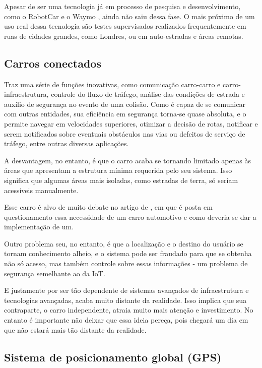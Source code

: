 \documentclass[12pt]{article}
\begin{document}
		Apesar de ser uma tecnologia já em processo de pesquisa e desenvolvimento, como o RobotCar \citep{oxford_robotics_institute_robotcar_nodate} e o Waymo \citep{google_-_alphabet_inc._waymo_2009}, ainda não saiu dessa fase. O mais próximo de um uso real dessa tecnologia são testes supervisados realizados frequentemente em ruas de cidades grandes, como Londres, ou em auto-estradas e áreas remotas.
		
		\subsection{Carros conectados}
		
		Traz uma série de funções inovativas, como comunicação carro-carro e carro-infraestrutura, controle do fluxo de tráfego, análise das condições de estrada e auxílio de segurança no evento de uma colisão. Como é capaz de se comunicar com outras entidades, sua eficiência em segurança torna-se quase absoluta, e o permite navegar em velocidades superiores, otimizar a decisão de rotas, notificar e serem notificados sobre eventuais obstáculos nas vias ou defeitos de serviço de tráfego, entre outras diversas aplicações.
		
		A desvantagem, no entanto, é que o carro acaba se tornando limitado apenas às áreas que apresentam a estrutura mínima requerida pelo seu sistema. Isso significa que algumas áreas mais isoladas, como estradas de terra, só seriam acessíveis manualmente.
		
		Esse carro é alvo de muito debate no artigo de \citet{mcbride_ethics_2016}, em que é posta em questionamento essa necessidade de um carro automotivo e como deveria se dar a implementação de um. 
		
		Outro problema seu, no entanto, é que a localização e o destino do usuário se tornam conhecimento alheio, e o sistema pode ser fraudado para que se obtenha não só acesso, mas também controle sobre essas informações - um problema de segurança semelhante ao da IoT.
		
		E justamente por ser tão dependente de sistemas avançados de infraestrutura e tecnologias avançadas, acaba muito distante da realidade. Isso implica que sua contraparte, o carro independente, atraia muito mais atenção e investimento. No entanto é importante não deixar que essa ideia pereça, pois chegará um dia em que não estará mais tão distante da realidade.
		
		\subsection{Sistema de posicionamento global (GPS)}
		
\end{document}
